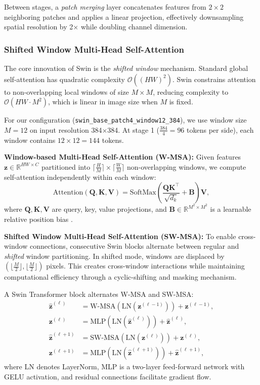 \documentclass[11pt,a4paper]{article}
\begin{document}
Between stages, a \textit{patch merging} layer concatenates features from \(2 \times 2\) neighboring patches and applies a linear projection, effectively downsampling spatial resolution by 2\(\times\) while doubling channel dimension.

\subsubsection{Shifted Window Multi-Head Self-Attention}

The core innovation of Swin is the \textit{shifted window} mechanism. Standard global self-attention has quadratic complexity \(\mathcal{O}((HW)^2)\). Swin constrains attention to non-overlapping local windows of size \(M \times M\), reducing complexity to \(\mathcal{O}(HW \cdot M^2)\), which is linear in image size when \(M\) is fixed.

For our configuration (\texttt{swin\_base\_patch4\_window12\_384}), we use window size \(M=12\) on input resolution 384\(\times\)384. At stage 1 (\(\frac{384}{4}=96\) tokens per side), each window contains \(12 \times 12 = 144\) tokens.

\textbf{Window-based Multi-Head Self-Attention (W-MSA):} Given features \(\mathbf{z} \in \mathbb{R}^{HW \times C}\) partitioned into \(\lceil \frac{H}{M} \rceil \times \lceil \frac{W}{M} \rceil\) non-overlapping windows, we compute self-attention independently within each window:
\begin{equation}
\mathrm{Attention}(\mathbf{Q}, \mathbf{K}, \mathbf{V}) = \mathrm{SoftMax}\left(\frac{\mathbf{Q}\mathbf{K}^\top}{\sqrt{d_k}} + \mathbf{B}\right)\mathbf{V},
\end{equation}
where \(\mathbf{Q}, \mathbf{K}, \mathbf{V}\) are query, key, value projections, and \(\mathbf{B} \in \mathbb{R}^{M^2 \times M^2}\) is a learnable relative position bias \cite{liu2021swin}.

\textbf{Shifted Window Multi-Head Self-Attention (SW-MSA):} To enable cross-window connections, consecutive Swin blocks alternate between regular and \textit{shifted} window partitioning. In shifted mode, windows are displaced by \((\lfloor \frac{M}{2} \rfloor, \lfloor \frac{M}{2} \rfloor)\) pixels. This creates cross-window interactions while maintaining computational efficiency through a cyclic-shifting and masking mechanism.

A Swin Transformer block alternates W-MSA and SW-MSA:
\begin{align}
\hat{\mathbf{z}}^{(\ell)} &= \mathrm{W\text{-}MSA}(\mathrm{LN}(\mathbf{z}^{(\ell-1)})) + \mathbf{z}^{(\ell-1)}, \\
\mathbf{z}^{(\ell)} &= \mathrm{MLP}(\mathrm{LN}(\hat{\mathbf{z}}^{(\ell)})) + \hat{\mathbf{z}}^{(\ell)}, \\
\hat{\mathbf{z}}^{(\ell+1)} &= \mathrm{SW\text{-}MSA}(\mathrm{LN}(\mathbf{z}^{(\ell)})) + \mathbf{z}^{(\ell)}, \\
\mathbf{z}^{(\ell+1)} &= \mathrm{MLP}(\mathrm{LN}(\hat{\mathbf{z}}^{(\ell+1)})) + \hat{\mathbf{z}}^{(\ell+1)},
\end{align}
where LN denotes LayerNorm, MLP is a two-layer feed-forward network with GELU activation, and residual connections facilitate gradient flow.
\end{document}
